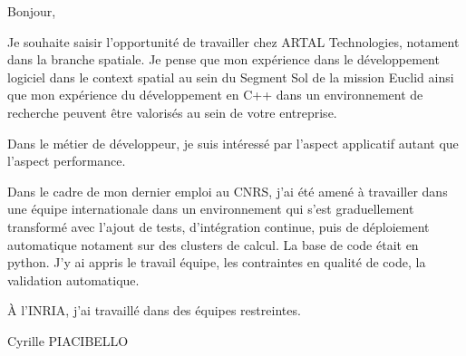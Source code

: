 \documentclass{article}
\begin{document}
Bonjour,

Je souhaite saisir l'opportunité de travailler chez ARTAL
Technologies, notament dans la branche spatiale. Je pense que mon
expérience dans le développement logiciel dans le context spatial au
sein du Segment Sol de la mission Euclid ainsi que mon expérience du
développement en C++ dans un environnement de recherche peuvent être
valorisés au sein de votre entreprise.

Dans le métier de développeur, je suis intéressé par l'aspect
applicatif autant que l'aspect performance. 

Dans le cadre de mon dernier emploi au CNRS, j'ai été amené à
travailler dans une équipe internationale dans un environnement qui
s'est graduellement transformé avec l'ajout de tests, d'intégration
continue, puis de déploiement automatique notament sur des clusters de
calcul. La base de code était en python. J'y ai appris le travail
équipe, les contraintes en qualité de code, la validation
automatique.

À l'INRIA, j'ai travaillé dans des équipes restreintes.

\bigskip %

\vspace{50pt} %

Cyrille PIACIBELLO
\end{document}
